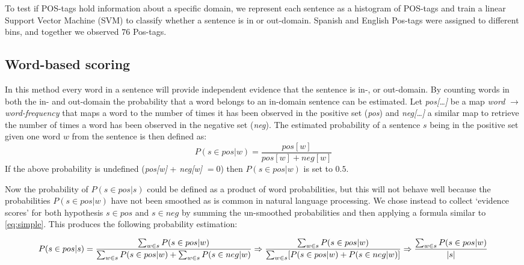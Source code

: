 \documentclass[11pt]{article}
\begin{document}
To test if POS-tags hold information about a specific domain, we represent each sentence as a histogram of POS-tags and train a linear Support Vector Machine (SVM) to classify whether a sentence is in or out-domain. Spanish and English Pos-tags were assigned to different bins, and together we observed $76$ Pos-tags.

\subsection{Word-based scoring}
\label{wbs}
In this method every word in a sentence will provide independent evidence that the sentence is in-, or out-domain. By counting words in both the in- and out-domain the probability that a word belongs to an in-domain sentence can be estimated. Let \textit{pos[\dots]} be a map \textit{word} $\rightarrow$ \textit{word-frequency} that maps a word to the number of times it has been observed in the positive set (\textit{pos}) and \textit{neg[\dots]} a similar map to retrieve the number of times a word has been observed in the negative set (\textit{neg}).
The estimated probability of a sentence $s$ being in the positive set given one word $w$ from the sentence is then defined as:
\begin{equation} \label{eq:simple} P(s\in pos | w) = \frac{pos[w]}{pos[w] + neg[w]} \end{equation}
If the above probability is undefined (\textit{pos[w]} + \textit{neg[w]} $= 0$) then $P(s\in pos | w)$ is set to $0.5$.

Now the probability of $P(s\in pos | s)$ could be defined as a product of word probabilities, but this will not behave well because the probabilities $P(s\in pos | w)$ have not been smoothed as is common in natural language processing. We chose instead to collect `evidence scores' for both hypothesis $s\in pos$ and $s\in neg$ by summing the un-smoothed probabilities and then applying a formula similar to \ref{eq:simple}. This produces the following probability estimation:

\begin{dmath} 
P(s\in pos | s)  = \\\\ 
\frac{\sum_{w\in s} P(s\in pos | w)}{\sum_{w\in s} P(s\in pos | w) + \sum_{w\in s} P(s\in neg | w)} \Rightarrow \\\\\\  
\frac{\sum_{w\in s} P(s\in pos | w)}{\sum_{w\in s} [ P(s\in pos | w) + P(s\in neg | w) ]} \Rightarrow \\\\\\ 
\frac{\sum_{w\in s} P(s\in pos | w)}{ | s | } 
\end{dmath}
\end{document}

